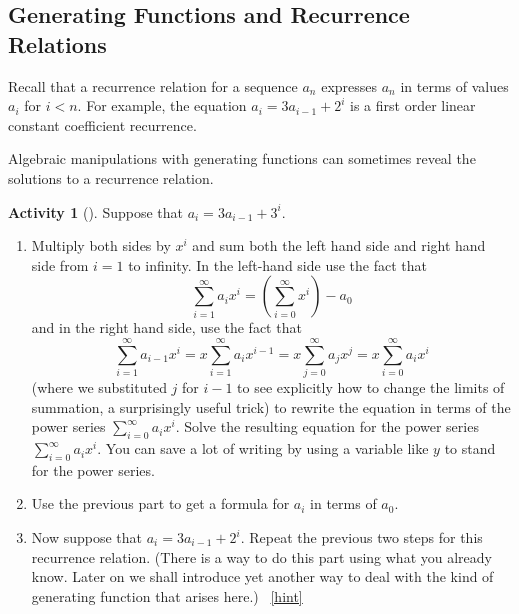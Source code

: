 \documentclass[10pt,]{book}
\theoremstyle{plain}
\theoremstyle{definition}
\theoremstyle{definition}
\theoremstyle{definition}
\newtheorem{activity}[project]{Activity}
\numberwithin{equation}{chapter}
\newcommand{\lt}{<}
\begin{document}
\subsection[{Generating Functions and Recurrence Relations}]{Generating Functions and Recurrence Relations}\label{subsection-36}
\hypertarget{p-1335}{}%
Recall that a recurrence relation for a sequence \(a_n\) expresses \(a_n\) in terms of values \(a_i\) for \(i\lt n\). For example, the equation \(a_i=3a_{i-1} +2^i\) is a first order linear constant coefficient recurrence.%
\par
\hypertarget{p-1336}{}%
Algebraic manipulations with generating functions can sometimes reveal the solutions to a recurrence relation.%
\begin{activity}[]\label{substituteandsolve}
\hypertarget{p-1337}{}%
Suppose that \(a_i=3a_{i-1} + 3^i\).%
\begin{enumerate}[font=\bfseries,label=(\alph*),ref=\alph*]
\item\label{task-246} \hypertarget{p-1338}{}%
Multiply both sides by \(x^i\) and sum both the left hand side and right hand side from \(i=1\) to infinity.  In the left-hand side use the fact that%
\begin{equation*}
\sum_{i=1}^\infty a_ix^i = (\sum_{i=0}^\infty x^i) -a_0
\end{equation*}
and in the right hand side, use the fact that%
\begin{equation*}
\sum_{i=1}^\infty a_{i-1}x^i = x\sum_{i=1}^\infty a_ix^{i-1}
=x\sum_{j=0}^\infty a_jx^j =x\sum_{i=0}^\infty a_ix^i
\end{equation*}
(where we substituted \(j\) for \(i-1\) to see explicitly how to change the limits of summation, a surprisingly useful trick) to rewrite the equation in terms of the power series \(\sum_{i=0}^\infty a_ix^i\).  Solve the resulting equation for the power series \(\sum_{i=0}^\infty a_ix^i\). You can save a lot of writing by using a variable like \(y\) to stand for the power series.%
\item\label{task-247} \hypertarget{p-1340}{}%
Use the previous part to get a formula for \(a_i\) in terms of \(a_0\).%
\item\label{task-248} \hypertarget{p-1342}{}%
Now suppose that \(a_i=3a_{i-1} + 2^i\).  Repeat the previous two steps for this recurrence relation.  (There is a way to do this part using what you already know.  Later on we shall introduce yet another way to deal with the kind of generating function that arises here.)%
~\hfill{\tiny\hyperlink{a-258.c}{[hint]}\hypertarget{q-258.c}{}}\end{enumerate}
\end{activity}
\end{document}
